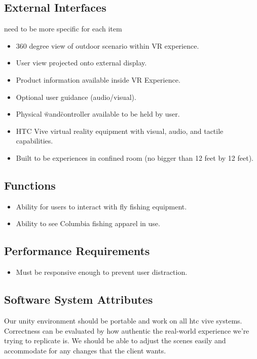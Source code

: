 \documentclass[10pt,journal,compsoc,onecolumn, draftclsnofoot]{IEEEtran}
\begin{document}
\subsection{External Interfaces}
need to be more specific for each item
\begin{itemize}
  \item 360 degree view of outdoor scenario within VR experience.
  \item User view projected onto external display.
  \item Product information available inside VR Experience.
  \item Optional user guidance (audio/visual).
  \item Physical \"wand\" controller available to be held by user.
  \item HTC Vive virtual reality equipment with visual, audio, and tactile capabilities.
  \item Built to be experiences in confined room (no bigger than 12 feet by 12 feet).
\end{itemize}

\subsection{Functions}
\begin{itemize}
  \item Ability for users to interact with fly fishing equipment.
  \item Ability to see Columbia fishing apparel in use.
\end{itemize}

\subsection{Performance Requirements}
\begin{itemize}
  \item Must be responsive enough to prevent user distraction.\cite{michalak_lind_round1}
\end{itemize}

\subsection{Software System Attributes}
Our unity environment should be portable and work on all htc vive systems.
Correctness can be evaluated by how authentic the real-world experience we're
trying to replicate is. We should be able to adjust the scenes easily and
accommodate for any changes that the client wants.
\end{document}

